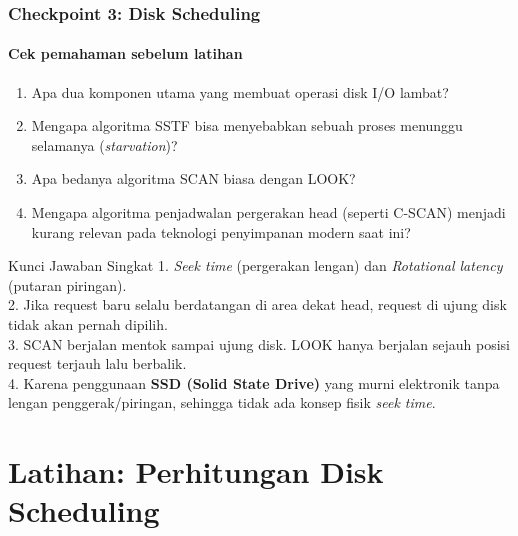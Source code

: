 \documentclass[t,aspectratio=169,xcolor=dvipsnames]{beamer}
\begin{document}
\begin{frame}
    \frametitle{Checkpoint 3: Disk Scheduling}
    \framesubtitle{Cek pemahaman sebelum latihan}
    \small
    \begin{enumerate}
        \item Apa dua komponen utama yang membuat operasi disk I/O lambat?
        \item Mengapa algoritma SSTF bisa menyebabkan sebuah proses menunggu selamanya (\textit{starvation})?
        \item Apa bedanya algoritma SCAN biasa dengan LOOK?
        \item Mengapa algoritma penjadwalan pergerakan head (seperti C-SCAN) menjadi kurang relevan pada teknologi penyimpanan modern saat ini?
    \end{enumerate}
    
    \vspace{0.3cm}
    \begin{block}{Kunci Jawaban Singkat}
        \scriptsize
        1. \textit{Seek time} (pergerakan lengan) dan \textit{Rotational latency} (putaran piringan).\\
        2. Jika request baru selalu berdatangan di area dekat head, request di ujung disk tidak akan pernah dipilih.\\
        3. SCAN berjalan mentok sampai ujung disk. LOOK hanya berjalan sejauh posisi request terjauh lalu berbalik.\\
        4. Karena penggunaan \textbf{SSD (Solid State Drive)} yang murni elektronik tanpa lengan penggerak/piringan, sehingga tidak ada konsep fisik \textit{seek time}.
    \end{block}
\end{frame}


\section{Latihan: Perhitungan Disk Scheduling}
\end{document}
